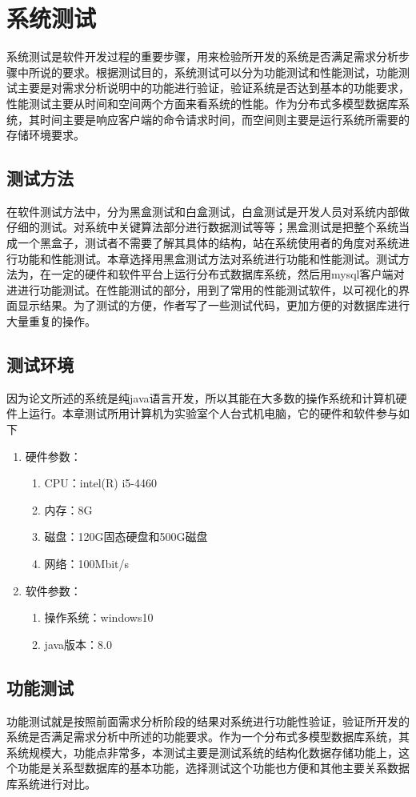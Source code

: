 
\chapter{系统测试}
系统测试是软件开发过程的重要步骤，用来检验所开发的系统是否满足需求分析步骤中所说的要求。根据测试目的，系统测试可以分为功能测试和性能测试，功能测试主要是对需求分析说明中的功能进行验证，验证系统是否达到基本的功能要求，性能测试主要从时间和空间两个方面来看系统的性能。作为分布式多模型数据库系统，其时间主要是响应客户端的命令请求时间，而空间则主要是运行系统所需要的存储环境要求。
\section{测试方法}
在软件测试方法中，分为黑盒测试和白盒测试，白盒测试是开发人员对系统内部做仔细的测试。对系统中关键算法部分进行数据测试等等；黑盒测试是把整个系统当成一个黑盒子，测试者不需要了解其具体的结构，站在系统使用者的角度对系统进行功能和性能测试。本章选择用黑盒测试方法对系统进行功能和性能测试。测试方法为，在一定的硬件和软件平台上运行分布式数据库系统，然后用mysql客户端对进进行功能测试。在性能测试的部分，用到了常用的性能测试软件，以可视化的界面显示结果。为了测试的方便，作者写了一些测试代码，更加方便的对数据库进行大量重复的操作。
\section{测试环境}
因为论文所述的系统是纯java语言开发，所以其能在大多数的操作系统和计算机硬件上运行。本章测试所用计算机为实验室个人台式机电脑，它的硬件和软件参与如下
\begin{enumerate}
	\item 硬件参数：
	\begin{enumerate}
		\item CPU：intel(R) i5-4460
		\item 内存：8G
		\item 磁盘：120G固态硬盘和500G磁盘
		\item 网络：100Mbit/s
	\end{enumerate}
\item 软件参数：
\begin{enumerate}
	\item 操作系统：windows10
	\item java版本：8.0
\end{enumerate}
\end{enumerate}
\section{功能测试}
功能测试就是按照前面需求分析阶段的结果对系统进行功能性验证，验证所开发的系统是否满足需求分析中所述的功能要求。作为一个分布式多模型数据库系统，其系统规模大，功能点非常多，本测试主要是测试系统的结构化数据存储功能上，这个功能是关系型数据库的基本功能，选择测试这个功能也方便和其他主要关系数据库系统进行对比。
